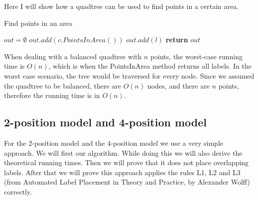 \documentclass[crop=false,a4paper,oneside,11pt]{article}
\begin{document}
Here I will show how a quadtree can be used to find points in a certain area.\\
\begin{algorithm}[H]
\caption{Find points in an area}
\begin{algorithmic}[1]
\State $out = \emptyset$
\State $out.add(c.PointsInArea())$
\EndIf
\EndFor
\Else{}
\State $out.add(l)$
\EndIf
\EndFor
\EndIf
\State \textbf{return} $out$
\EndProcedure
\end{algorithmic}
\end{algorithm}

When dealing with a balanced quadtree with $n$ points, the worst-case running time is $O(n)$, which is when the PointsInArea method returns all labels. In the worst case scenario, the tree would be traversed for every node. Since we assumed the quadtree to be balanced, there are $O(n)$ nodes, and there are $n$ points, therefore the running time is in $O(n)$.

\subsection{2-position model and 4-position model}
For the 2-position model and the 4-position model we use a very simple approach. We will first our algorithm. While doing this we will also derive the theoretical running times. Then we will prove that it does not place overlapping labels. After that we will prove this approach applies the rules L1, L2 and L3 (from Automated Label Placement in Theory and Practice, by Alexander Wolff) correctly.
\end{document}
